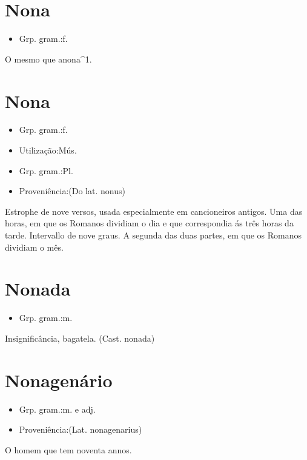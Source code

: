 \section{Nona}
\begin{itemize}
\item {Grp. gram.:f.}
\end{itemize}
O mesmo que \textunderscore anona\textunderscore ^1.
\section{Nona}
\begin{itemize}
\item {Grp. gram.:f.}
\end{itemize}
\begin{itemize}
\item {Utilização:Mús.}
\end{itemize}
\begin{itemize}
\item {Grp. gram.:Pl.}
\end{itemize}
\begin{itemize}
\item {Proveniência:(Do lat. \textunderscore nonus\textunderscore )}
\end{itemize}
Estrophe de nove versos, usada especialmente em cancioneiros antigos.
Uma das horas, em que os Romanos dividiam o dia e que correspondia ás três horas da tarde.
Intervallo de nove graus.
A segunda das duas partes, em que os Romanos dividiam o mês.
\section{Nonada}
\begin{itemize}
\item {Grp. gram.:m.}
\end{itemize}
Insignificância, bagatela.
(Cast. \textunderscore nonada\textunderscore )
\section{Nonagenário}
\begin{itemize}
\item {Grp. gram.:m.  e  adj.}
\end{itemize}
\begin{itemize}
\item {Proveniência:(Lat. \textunderscore nonagenarius\textunderscore )}
\end{itemize}
O homem que tem noventa annos.
